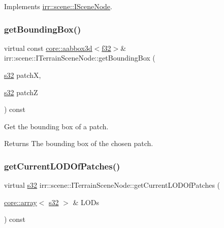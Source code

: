 Implements \hyperlink{classirr_1_1scene_1_1ISceneNode_a223f718fc2f4944b5ad28c592f6cc8c6}{irr\+::scene\+::\+I\+Scene\+Node}.

\mbox{\label{classirr_1_1scene_1_1ITerrainSceneNode_a383501cc9c5cd30176f1f7ff6f8ab817}} 
\subsubsection{\texorpdfstring{get\+Bounding\+Box()}{getBoundingBox()}\hspace{0.1cm}{\footnotesize\ttfamily [2/2]}}
{\footnotesize\ttfamily virtual const \hyperlink{classirr_1_1core_1_1aabbox3d}{core\+::aabbox3d}$<$\hyperlink{namespaceirr_a0277be98d67dc26ff93b1a6a1d086b07}{f32}$>$\& irr\+::scene\+::\+I\+Terrain\+Scene\+Node\+::get\+Bounding\+Box (\begin{DoxyParamCaption}\item[{\hyperlink{namespaceirr_ac66849b7a6ed16e30ebede579f9b47c6}{s32}}]{patchX,  }\item[{\hyperlink{namespaceirr_ac66849b7a6ed16e30ebede579f9b47c6}{s32}}]{patchZ }\end{DoxyParamCaption}) const\hspace{0.3cm}{\ttfamily [pure virtual]}}



Get the bounding box of a patch. 

\begin{DoxyReturn}{Returns}
The bounding box of the chosen patch. 
\end{DoxyReturn}
\mbox{\label{classirr_1_1scene_1_1ITerrainSceneNode_a0d310851f0ebf1fce18d3a2c0f3dceab}} 
\subsubsection{\texorpdfstring{get\+Current\+L\+O\+D\+Of\+Patches()}{getCurrentLODOfPatches()}}
{\footnotesize\ttfamily virtual \hyperlink{namespaceirr_ac66849b7a6ed16e30ebede579f9b47c6}{s32} irr\+::scene\+::\+I\+Terrain\+Scene\+Node\+::get\+Current\+L\+O\+D\+Of\+Patches (\begin{DoxyParamCaption}\item[{\hyperlink{classirr_1_1core_1_1array}{core\+::array}$<$ \hyperlink{namespaceirr_ac66849b7a6ed16e30ebede579f9b47c6}{s32} $>$ \&}]{L\+O\+Ds }\end{DoxyParamCaption}) const\hspace{0.3cm}{\ttfamily [pure virtual]}}



